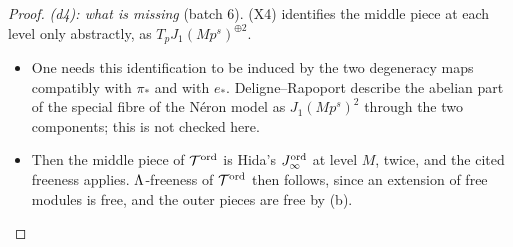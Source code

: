 \begin{proof}
\emph{(d4): what is missing} (batch 6). (X4) identifies the middle piece at each level only abstractly, as $T_pJ_1(Mp^s)^{\oplus2}$.
\begin{itemize}
\item One needs this identification to be induced by the two degeneracy maps compatibly with $\pi_*$ and with $e_*$. Deligne--Rapoport describe the
  abelian part of the special fibre of the Néron model as $J_1(Mp^s)^2$ through the two components; this is not checked here.
\item Then the middle piece of $\mathcal{T}^{\mathrm{ord}}$ is Hida's $J^{\rm ord}_\infty$ at level $M$, twice, and the cited freeness applies. $\Lambda$-freeness of $\mathcal{T}^{\mathrm{ord}}$ then follows,
  since an extension of free modules is free, and the outer pieces are free by (b).
\end{itemize}
\end{proof}
